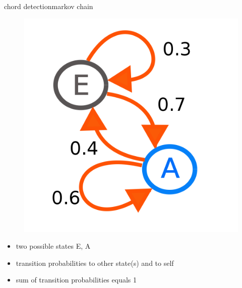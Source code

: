         \begin{frame}{chord detection}{markov chain}
            \begin{figure}
                \centering
                    \includegraphics[scale=.1]{graph/MarkovChain}
            \end{figure}
            \begin{itemize}
                \item   two possible states E, A
                \item   transition probabilities to other state(s) and to self
                \item   sum of transition probabilities equals 1
            \end{itemize}
        \end{frame}
        

